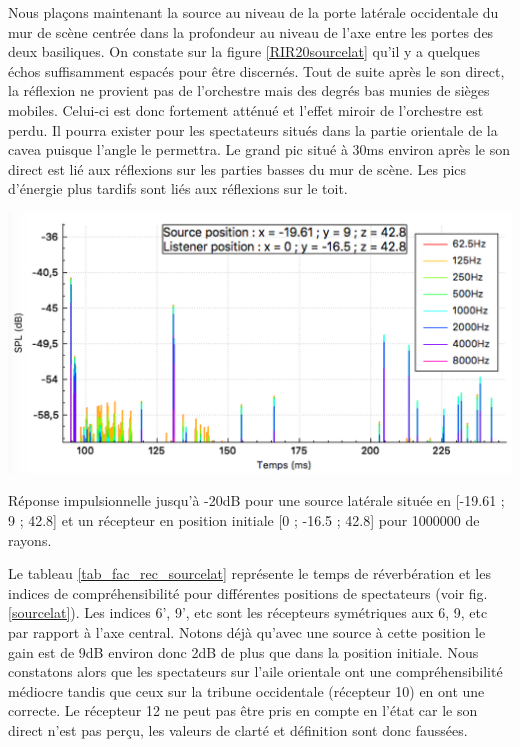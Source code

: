Nous plaçons maintenant la source au niveau de la porte latérale occidentale du mur de scène centrée dans la profondeur au niveau de l'axe entre les portes des deux \glspl{basilique}. On constate sur la figure \ref{RIR20sourcelat} qu'il y a quelques échos suffisamment espacés pour être discernés. Tout de suite après le son direct, la réflexion ne provient pas de l'orchestre mais des degrés bas munies de sièges mobiles. Celui-ci est donc fortement atténué et l'effet miroir de l'orchestre est perdu. Il pourra exister pour les spectateurs situés dans la partie orientale de la \gls{cavea} puisque l'angle le permettra. Le grand pic situé à 30ms environ après le son direct est lié aux réflexions sur les parties basses du mur de scène. Les pics d'énergie plus tardifs sont liés aux réflexions sur le toit.
%
\begin{figureth}
	\includegraphics[width=0.7\linewidth]{images/RIR20sourcelat}
	\caption{Réponse impulsionnelle jusqu'à -20dB pour une source latérale située en [-19.61 ; 9 ; 42.8] et un récepteur en position initiale [0 ; -16.5 ; 42.8] pour 1000000 de rayons.}
	\label{RIR20sourcelat}
\end{figureth}
%
Le tableau \ref{tab_fac_rec_sourcelat} représente le temps de réverbération et les indices de compréhensibilité pour différentes positions de spectateurs (voir fig. \ref{sourcelat}). Les indices 6', 9', etc sont les récepteurs symétriques aux 6, 9, etc par rapport à l'axe central. Notons déjà qu'avec une source à cette position le gain est de 9dB environ donc 2dB de plus que dans la position initiale. Nous constatons alors que les spectateurs sur l'aile orientale ont une compréhensibilité médiocre tandis que ceux sur la tribune occidentale (récepteur 10) en ont une correcte. Le récepteur 12 ne peut pas être pris en compte en l'état car le son direct n'est pas perçu, les valeurs de clarté et définition sont donc faussées.

